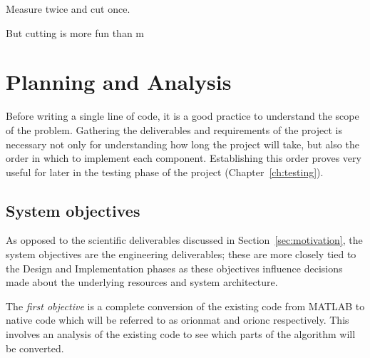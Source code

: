 \begin{savequote}[0.55\linewidth]
	\begin{fancyquote}
		Measure twice and cut once.
	\end{fancyquote}

	\begin{fancyquote}
		But cut\hspace{1em}ting is more fun than m\hspace{0.5em}\raisebox{-0.1em}{eas}\hspace{0.5em}\raisebox{-0.3em}{uri}\hspace{0.5em}\raisebox{-0.5em}{ng!}
	\end{fancyquote}
\end{savequote}

\chapter{Planning and Analysis}\label{ch:analysis}

Before writing a single line of code, it is a good practice to understand the
scope of the problem. Gathering the deliverables and requirements of the
project is necessary not only for understanding how long the project will take,
but also the order in which to implement each component. Establishing this
order proves very useful for later in the testing phase of the project
(Chapter~\ref{ch:testing}).

\section{System objectives}\label{sec:objectives}

As opposed to the scientific deliverables discussed in
Section~\ref{sec:motivation}, the system objectives are the engineering
deliverables; these are more closely tied to the Design and Implementation
phases as these objectives influence decisions made about the underlying
resources and system architecture.

The \emph{first objective} is a complete conversion of the
existing code from MATLAB to native code which will be referred to
as \gls{orionmat} and \gls{orionc} respectively. This involves an
analysis of the existing code to see which parts of the algorithm will be converted.

